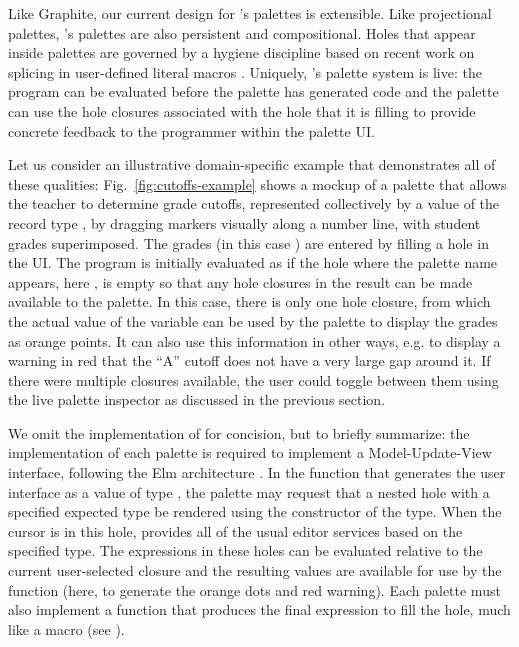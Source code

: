 Like Graphite, our current design for \Hazel's palettes is extensible.
Like projectional palettes, \Hazel's palettes are also persistent and compositional. 
Holes that appear inside palettes
are governed by a hygiene discipline based on recent work on splicing in user-defined literal macros
\cite{tlms-icfp18}. 
Uniquely, \Hazel's palette system is live: the program 
can be evaluated before the palette has generated code
and the palette can use the hole closures associated with the hole that it is filling 
to provide concrete feedback to the programmer within the palette UI.

Let us consider an illustrative domain-specific example that demonstrates
all of these qualities: 
Fig.~\ref{fig:cutoffs-example} shows a mockup of a palette that allows the teacher to determine grade cutoffs, represented collectively by a value of the record type , by dragging markers visually along a number line, with student grades superimposed. The grades (in this case ) are entered by filling a hole in the UI. 
The program is initially evaluated as if the hole where the palette name appears, here , is empty so that 
any hole closures in the result can be made available to the palette. In this case, there is only one hole closure, from which the
actual value of the variable  can be 
used by the palette to display the grades as orange points.
It can also use this information in other ways, e.g. to display a warning in red
that the ``A'' cutoff does not have a very large gap around
it. If there were multiple closures available, the user could
toggle between them using the live palette inspector as discussed in the previous section.

%
We omit the implementation of  for concision, but to briefly summarize: the implementation of each palette is required to implement a
Model-Update-View interface, following the Elm architecture \cite{ElmArchitecture}. 
In the  function that generates the user
interface as a value of type , the palette may request that a nested hole with
a specified expected type be rendered using the  constructor of the  type. When the cursor is in this hole, \Hazel provides all of the usual editor services based on the specified type. The expressions in these holes 
can be evaluated relative to the current user-selected closure and the resulting values are available for use by the  function (here, to generate the orange dots and red warning). 
Each palette must
also implement a  function that produces the final
expression to fill the hole, much like a macro (see \cite{tlms-icfp18}).
